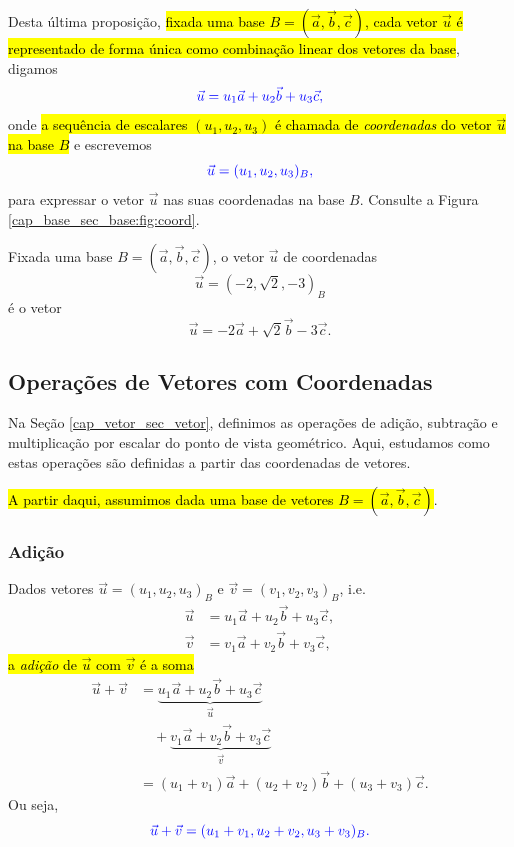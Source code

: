 Desta última proposição, \hl{fixada uma base $B = \left(\vec{a}, \vec{b}, \vec{c}\right)$, cada vetor $\vec{u}$ é representado de forma única como combinação linear dos vetores da base}, digamos
\begin{equation}\color{blue}\vec{u} = u_1\vec{a} + u_2\vec{b} + u_3\vec{c},
\end{equation}
onde \hl{a sequência de escalares $(u_1, u_2, u_3)$ é chamada de \emph{coordenadas} do vetor $\vec{u}$ na base $B$} e escrevemos
\begin{equation}\color{blue}\vec{u} = (u_1, u_2, u_3)_B,
\end{equation}
para expressar o vetor $\vec{u}$ nas suas coordenadas na base $B$. Consulte a Figura \ref{cap_base_sec_base:fig:coord}.

\begin{ex}
  Fixada uma base $B = (\vec{a}, \vec{b}, \vec{c})$, o vetor $\vec{u}$ de coordenadas 
  \begin{equation}
    \vec{u}=(-2,\sqrt{2},-3)_B
  \end{equation} 
  é o vetor 
  \begin{equation}
    \vec{u} = -2\vec{a} + \sqrt{2}\vec{b} - 3\vec{c}.
  \end{equation}
\end{ex}

\subsection{Operações de Vetores com Coordenadas}

Na Seção \ref{cap_vetor_sec_vetor}, definimos as operações de adição, subtração e multiplicação por escalar do ponto de vista geométrico. Aqui, estudamos como estas operações são definidas a partir das coordenadas de vetores.

\hl{A partir daqui, assumimos dada uma base de vetores $B = (\vec{a}, \vec{b}, \vec{c})$}.

\subsubsection{Adição}

Dados vetores $\vec{u} = (u_1, u_2, u_3)_B$ e $\vec{v} = (v_1, v_2, v_3)_B$, i.e.
\begin{align}
  \vec{u} &= u_1\vec{a} + u_2\vec{b} + u_3\vec{c},\\
  \vec{v} &= v_1\vec{a} + v_2\vec{b} + v_3\vec{c},
\end{align}
\hl{a \emph{adição} de $\vec{u}$ com $\vec{v}$ é a soma}
\begin{align}
  \vec{u}+\vec{v} &= \underbrace{u_1\vec{a} + u_2\vec{b} + u_3\vec{c}}_{\vec{u}}\nonumber\\ 
  &\quad+ \underbrace{v_1\vec{a} + v_2\vec{b} + v_3\vec{c}}_{\vec{v}}\\
  &= (u_1+v_1)\vec{a} + (u_2+v_2)\vec{b} + (u_3+v_3)\vec{c}.
\end{align}
Ou seja,
\begin{equation}\color{blue}\vec{u}+\vec{v} = (u_1+v_1, u_2+v_2, u_3+v_3)_B.
\end{equation}

